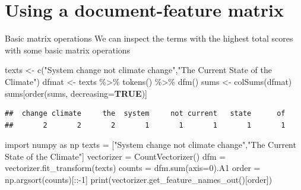 \documentclass[
  10pt,
  ignorenonframetext,
  aspectratio=169]{beamer}
\newenvironment{Shaded}{\begin{snugshade}}{\end{snugshade}}
\newcommand{\AttributeTok}[1]{\textcolor[rgb]{0.80,0.80,0.80}{#1}}
\newcommand{\BuiltInTok}[1]{\textcolor[rgb]{0.80,0.80,0.80}{#1}}
\newcommand{\ConstantTok}[1]{\textcolor[rgb]{0.86,0.64,0.64}{\textbf{#1}}}
\newcommand{\DecValTok}[1]{\textcolor[rgb]{0.86,0.86,0.80}{#1}}
\newcommand{\FunctionTok}[1]{\textcolor[rgb]{0.94,0.94,0.56}{#1}}
\newcommand{\ImportTok}[1]{\textcolor[rgb]{0.80,0.80,0.80}{#1}}
\newcommand{\NormalTok}[1]{\textcolor[rgb]{0.80,0.80,0.80}{#1}}
\newcommand{\OperatorTok}[1]{\textcolor[rgb]{0.94,0.94,0.82}{#1}}
\newcommand{\OtherTok}[1]{\textcolor[rgb]{0.94,0.94,0.56}{#1}}
\newcommand{\SpecialCharTok}[1]{\textcolor[rgb]{0.86,0.64,0.64}{#1}}
\newcommand{\StringTok}[1]{\textcolor[rgb]{0.80,0.58,0.58}{#1}}
\begin{document}
\hypertarget{using-a-document-feature-matrix}{%
\section{Using a document-feature
matrix}\label{using-a-document-feature-matrix}}

\begin{frame}[fragile]{Basic matrix operations}
\protect\hypertarget{basic-matrix-operations}{}
We can inspect the terms with the highest total scores with some basic
matrix operations

\scriptsize

\begin{Shaded}
\begin{Highlighting}[]
\NormalTok{texts }\OtherTok{\textless{}{-}} \FunctionTok{c}\NormalTok{(}\StringTok{"System change not climate change"}\NormalTok{,}\StringTok{"The Current State of the Climate"}\NormalTok{)}
\NormalTok{dfmat }\OtherTok{\textless{}{-}}\NormalTok{ texts }\SpecialCharTok{\%\textgreater{}\%} \FunctionTok{tokens}\NormalTok{() }\SpecialCharTok{\%\textgreater{}\%} \FunctionTok{dfm}\NormalTok{()}
\NormalTok{sums }\OtherTok{\textless{}{-}} \FunctionTok{colSums}\NormalTok{(dfmat)}
\NormalTok{sums[}\FunctionTok{order}\NormalTok{(sums, }\AttributeTok{decreasing=}\ConstantTok{TRUE}\NormalTok{)]}
\end{Highlighting}
\end{Shaded}

\begin{verbatim}
##  change climate     the  system     not current   state      of 
##       2       2       2       1       1       1       1       1
\end{verbatim}

\begin{Shaded}
\begin{Highlighting}[]
\ImportTok{import}\NormalTok{ numpy }\ImportTok{as}\NormalTok{ np}
\NormalTok{texts }\OperatorTok{=}\NormalTok{ [}\StringTok{"System change not climate change"}\NormalTok{,}\StringTok{"The Current State of the Climate"}\NormalTok{]}
\NormalTok{vectorizer }\OperatorTok{=}\NormalTok{ CountVectorizer()}
\NormalTok{dfm }\OperatorTok{=}\NormalTok{ vectorizer.fit\_transform(texts)}
\NormalTok{counts }\OperatorTok{=}\NormalTok{ dfm.}\BuiltInTok{sum}\NormalTok{(axis}\OperatorTok{=}\DecValTok{0}\NormalTok{).A1}
\NormalTok{order }\OperatorTok{=}\NormalTok{ np.argsort(counts)[::}\OperatorTok{{-}}\DecValTok{1}\NormalTok{]}
\BuiltInTok{print}\NormalTok{(vectorizer.get\_feature\_names\_out()[order])}
\end{Highlighting}
\end{Shaded}


\end{frame}
\end{document}
